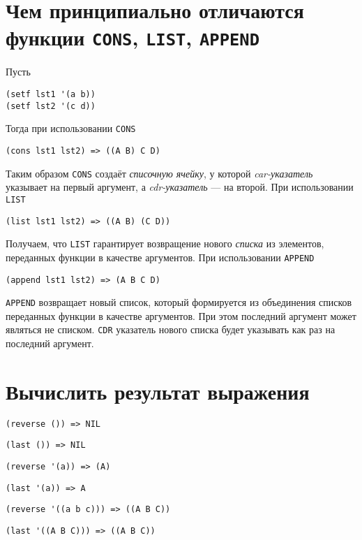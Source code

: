 
\section{Чем принципиально отличаются функции \texttt{CONS}, \texttt{LIST}, \texttt{APPEND}}

Пусть
\begin{lstlisting}
(setf lst1 '(a b))
(setf lst2 '(c d))
\end{lstlisting}
Тогда при использовании \verb|CONS|
\begin{lstlisting}
(cons lst1 lst2) => ((A B) C D) 
\end{lstlisting}
Таким образом \verb|CONS| создаёт \textit{списочную ячейку}, у которой \textit{car-указатель} указывает на первый аргумент, а \textit{cdr-указатель} --- на второй.
При использовании \verb|LIST|
\begin{lstlisting}
(list lst1 lst2) => ((A B) (C D)) 
\end{lstlisting}
Получаем, что \verb|LIST| гарантирует возвращение нового \textit{списка} из элементов, переданных функции в качестве аргументов.
При использовании \verb|APPEND|
\begin{lstlisting}
(append lst1 lst2) => (A B C D)
\end{lstlisting}
\verb|APPEND| возвращает новый список, который формируется из объединения списков переданных функции в качестве аргументов. При этом последний аргумент может являться не списком. \verb|CDR| указатель нового списка будет указывать как раз на последний аргумент.


\section{Вычислить результат выражения}

\problem \hfill

\begin{lstlisting}
(reverse ()) => NIL
\end{lstlisting}


\problem \hfill

\begin{lstlisting}
(last ()) => NIL
\end{lstlisting}


\problem \hfill

\begin{lstlisting}
(reverse '(a)) => (A)
\end{lstlisting}


\problem \hfill

\begin{lstlisting}
(last '(a)) => A
\end{lstlisting}


\problem \hfill

\begin{lstlisting}
(reverse '((a b c))) => ((A B C))
\end{lstlisting}


\problem \hfill

\begin{lstlisting}
(last '((A B C))) => ((A B C))
\end{lstlisting}